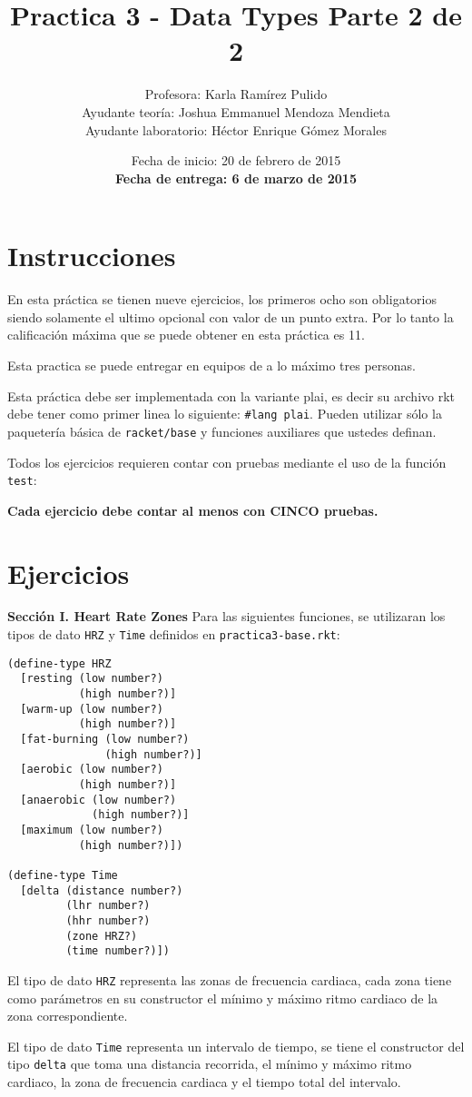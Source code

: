 \documentclass{article}
\author{Profesora: Karla Ramírez Pulido\\
  Ayudante teoría: Joshua Emmanuel Mendoza Mendieta\\
  Ayudante laboratorio: Héctor Enrique Gómez Morales}
\title{Practica 3 - Data Types Parte 2 de 2}
\date{Fecha de inicio: 20 de febrero de 2015\\
  \textbf{Fecha de entrega: 6 de marzo de 2015}}
\begin{document}
\maketitle
\section{Instrucciones}
En esta práctica se tienen nueve ejercicios, los primeros ocho son
obligatorios siendo solamente el ultimo opcional con valor de un
punto extra. Por lo tanto la calificación máxima que se puede obtener en
esta práctica es 11.

Esta practica se puede entregar en equipos de a lo máximo tres
personas.

Esta práctica debe ser implementada con la variante plai, es decir
su archivo rkt debe tener como primer linea lo siguiente:
\texttt{\#lang plai}. Pueden utilizar sólo la paquetería básica de
\texttt{racket/base} y funciones auxiliares que ustedes definan.

Todos los ejercicios requieren contar con pruebas mediante el uso de
la función \texttt{test}:

\textbf{Cada ejercicio debe contar al menos con CINCO pruebas.}

\section{Ejercicios}
\textbf{Sección I. Heart Rate Zones} Para las siguientes funciones, se utilizaran los tipos de dato \verb;HRZ; y \verb;Time; definidos en \verb;practica3-base.rkt;:
\begin{verbatim}
(define-type HRZ
  [resting (low number?)
           (high number?)]
  [warm-up (low number?)
           (high number?)]
  [fat-burning (low number?)
               (high number?)]
  [aerobic (low number?)
           (high number?)]
  [anaerobic (low number?)
             (high number?)]
  [maximum (low number?)
           (high number?)])

(define-type Time
  [delta (distance number?)
         (lhr number?)
         (hhr number?)
         (zone HRZ?)
         (time number?)])
\end{verbatim}

El tipo de dato \verb;HRZ; representa las zonas de frecuencia cardiaca,
cada zona tiene como parámetros en su constructor el mínimo y máximo ritmo cardiaco
de la zona correspondiente.

El tipo de dato \verb;Time; representa un intervalo de tiempo, se tiene el constructor del tipo \verb;delta; que toma una distancia recorrida, el mínimo y máximo ritmo cardiaco, la zona de frecuencia cardiaca y el tiempo total del intervalo.
\end{document}
